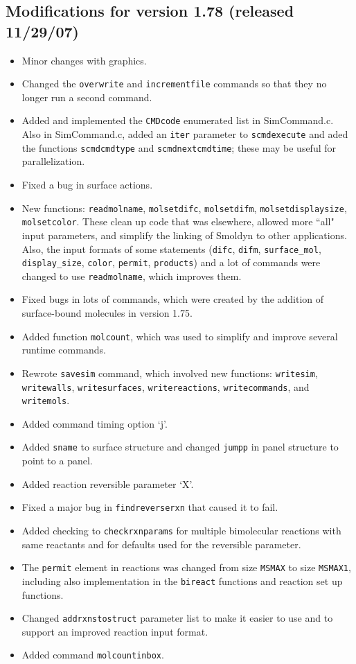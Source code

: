 \documentclass {scrbook}
\newcommand {\ttt} {\texttt}
\begin{document}
\subsection{Modifications for version 1.78 (released 11/29/07)}
\begin{itemize}
\item Minor changes with graphics.
\item Changed the \ttt{overwrite} and \ttt{incrementfile} commands so that they no longer run a second command.
\item Added and implemented the \ttt{CMDcode} enumerated list in SimCommand.c. Also in SimCommand.c, added an \ttt{iter} parameter to \ttt{scmdexecute} and aded the functions \ttt{scmdcmdtype} and \ttt{scmdnextcmdtime}; these may be useful for parallelization.
\item Fixed a bug in surface actions.
\item New functions: \ttt{readmolname}, \ttt{molsetdifc}, \ttt{molsetdifm}, \ttt{molsetdisplaysize}, \ttt{molsetcolor}. These clean up code that was elsewhere, allowed more ``all" input parameters, and simplify the linking of Smoldyn to other applications. Also, the input formats of some statements (\ttt{difc}, \ttt{difm}, \ttt{surface\_mol}, \ttt{display\_size}, \ttt{color}, \ttt{permit}, \ttt{products}) and a lot of commands were changed to use \ttt{readmolname}, which improves them.
\item Fixed bugs in lots of commands, which were created by the addition of surface-bound molecules in version 1.75.
\item Added function \ttt{molcount}, which was used to simplify and improve several runtime commands.
\item Rewrote \ttt{savesim} command, which involved new functions: \ttt{writesim}, \ttt{writewalls}, \ttt{writesurfaces}, \ttt{writereactions}, \ttt{writecommands}, and \ttt{writemols}.
\item Added command timing option `j'.
\item Added \ttt{sname} to surface structure and changed \ttt{jumpp} in panel structure to point to a panel.
\item Added reaction reversible parameter `X'.
\item Fixed a major bug in \ttt{findreverserxn} that caused it to fail.
\item Added checking to \ttt{checkrxnparams} for multiple bimolecular reactions with same reactants and for defaults used for the reversible parameter.
\item The \ttt{permit} element in reactions was changed from size \ttt{MSMAX} to size \ttt{MSMAX1}, including also implementation in the \ttt{bireact} functions and reaction set up functions.
\item Changed \ttt{addrxnstostruct} parameter list to make it easier to use and to support an improved reaction input format.
\item Added command \ttt{molcountinbox}.
\end{itemize}
\end{document}
